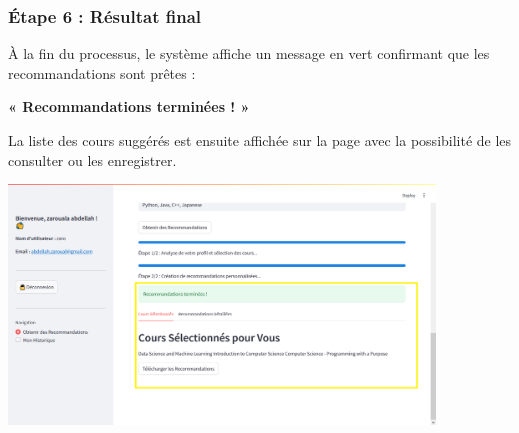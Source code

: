\vspace{0.3cm}

\subsubsection*{Étape 6 : Résultat final}

À la fin du processus, le système affiche un message en vert confirmant que les recommandations sont prêtes :

\begin{center}
\textbf{« Recommandations terminées ! »}
\end{center}

La liste des cours suggérés est ensuite affichée sur la page avec la possibilité de les consulter ou les enregistrer.

\begin{center}
\includegraphics[width=0.85\textwidth]{images/afiicher le recomodation.png}
\end{center}